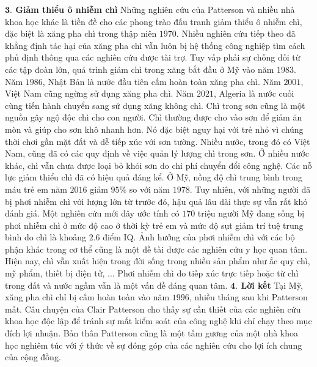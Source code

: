 \begin{multicols}{2}
	\vskip 0.1cm
	\textbf{\color{timhieukhoahoc}$\pmb{3.}$ Giảm thiểu ô nhiễm chì}
	\vskip 0.1cm
	Những nghiên cứu của Patterson và nhiều nhà khoa học khác là tiền đề cho các phong trào đấu tranh giảm thiểu ô nhiễm chì, đặc biệt là xăng pha chì trong thập niên $1970$. Nhiều nghiên cứu tiếp theo đã khẳng định tác hại của xăng pha chì vẫn luôn bị hệ thống công nghiệp tìm cách phủ định thông qua các nghiên cứu được tài trợ. Tuy vấp phải sự chống đối từ các tập đoàn lớn, quá trình giảm chì trong xăng bắt đầu ở Mỹ vào năm $1983$. Năm $1986$, Nhật Bản là nước đầu tiên cấm hoàn toàn xăng pha chì. Năm $2001$, Việt Nam cũng ngừng sử dụng xăng pha chì. Năm $2021$, Algeria là nước cuối cùng tiến hành chuyển sang sử dụng xăng không chì.
	\vskip 0.1cm
	Chì trong sơn cũng là một nguồn gây ngộ độc chì cho con người. Chì thường được cho vào sơn để giảm ăn mòn và giúp cho sơn khô nhanh hơn. Nó đặc biệt nguy hại với trẻ nhỏ vì chúng thời chơi gần mặt đất và dễ tiếp xúc với sơn tường. Nhiều nước, trong đó có Việt Nam, cũng đã có các quy định về việc quản lý lượng chì trong sơn. Ở nhiều nước khác, chì vẫn chưa được loại bỏ khỏi sơn do chi phí chuyển đổi công nghệ.
	\vskip 0.1cm
	Các nỗ lực giảm thiểu chì đã có hiệu quả đáng kể. Ở Mỹ, nồng độ chì trung bình trong máu trẻ em năm $2016$ giảm $95\%$ so với năm $1978$. Tuy nhiên, với những người đã bị phơi nhiễm chì với lượng lớn từ trước đó, hậu quả lâu dài thực sự vẫn rất khó đánh giá. Một nghiên cứu mới đây ước tính có $170$ triệu người Mỹ đang sống bị phơi nhiễm chì ở mức độ cao ở thời kỳ trẻ em và mức độ sụt giảm trí tuệ trung bình do chì là khoảng $2{.}6$ điểm IQ. Ảnh hưởng của phơi nhiễm chì với các bộ phận khác trong cơ thể cũng là một đề tài được các nghiên cứu y học quan tâm.
	\vskip 0.1cm
	Hiện nay, chì vẫn xuất hiện trong đời sống trong nhiều sản phẩm như ắc quy chì, mỹ phẩm, thiết bị điện tử, ... Phơi nhiễm chì do tiếp xúc trực tiếp hoặc từ chì trong đất và nước ngầm vẫn là một vấn đề đáng quan tâm.
	\vskip 0.1cm
	\textbf{\color{timhieukhoahoc}$\pmb{4.}$ Lời kết}
	\vskip 0.1cm
	Tại Mỹ, xăng pha chì chỉ bị cấm hoàn toàn vào năm $1996$, nhiều tháng sau khi Patterson mất. Câu chuyện của Clair Patterson cho thấy sự cần thiết của các nghiên cứu khoa học độc lập để tránh sự mất kiểm soát của công nghệ khi chỉ chạy theo mục đích lợi nhuận. Bản thân Patterson cũng là một tấm gương của một nhà khoa học nghiêm túc với ý thức về sự đóng góp của các nghiên cứu cho lợi ích chung của cộng đồng.
	\begin{figure}[H]
		\vspace*{5pt}
		\centering
		\captionsetup{labelformat= empty, justification=centering}

\end{figure}
\end{multicols}
